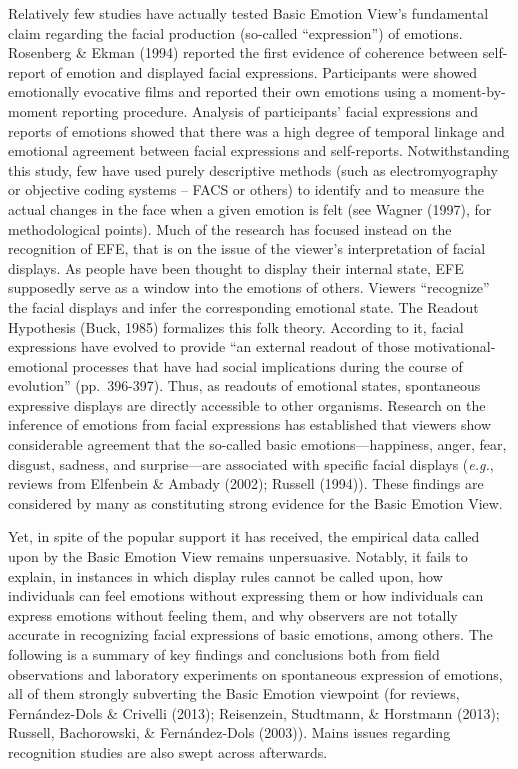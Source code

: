 \documentclass[man]{apa6}
\begin{document}
Relatively few studies have actually tested Basic Emotion View's fundamental claim regarding the facial production (so-called \enquote{expression}) of emotions. Rosenberg \& Ekman (1994) reported the first evidence of coherence between self-report of emotion and displayed facial expressions. Participants were showed emotionally evocative films and reported their own emotions using a moment-by-moment reporting procedure. Analysis of participants' facial expressions and reports of emotions showed that there was a high degree of temporal linkage and emotional agreement between facial expressions and self-reports. Notwithstanding this study, few have used purely descriptive methods (such as electromyography or objective coding systems -- FACS or others) to identify and to measure the actual changes in the face when a given emotion is felt (see Wagner (1997), for methodological points). Much of the research has focused instead on the recognition of EFE, that is on the issue of the viewer's interpretation of facial displays. As people have been thought to display their internal state, EFE supposedly serve as a window into the emotions of others. Viewers \enquote{recognize} the facial displays and infer the corresponding emotional state. The Readout Hypothesis (Buck, 1985) formalizes this folk theory. According to it, facial expressions have evolved to provide \enquote{an external readout of those motivational-emotional processes that have had social implications during the course of evolution} (pp.~396-397). Thus, as readouts of emotional states, spontaneous expressive displays are directly accessible to other organisms. Research on the inference of emotions from facial expressions has established that viewers show considerable agreement that the so-called basic emotions---happiness, anger, fear, disgust, sadness, and surprise---are associated with specific facial displays (\emph{e.g.}, reviews from Elfenbein \& Ambady (2002); Russell (1994)). These findings are considered by many as constituting strong evidence for the Basic Emotion View.

Yet, in spite of the popular support it has received, the empirical data called upon by the Basic Emotion View remains unpersuasive. Notably, it fails to explain, in instances in which display rules cannot be called upon, how individuals can feel emotions without expressing them or how individuals can express emotions without feeling them, and why observers are not totally accurate in recognizing facial expressions of basic emotions, among others. The following is a summary of key findings and conclusions both from field observations and laboratory experiments on spontaneous expression of emotions, all of them strongly subverting the Basic Emotion viewpoint (for reviews, Fernández-Dols \& Crivelli (2013); Reisenzein, Studtmann, \& Horstmann (2013); Russell, Bachorowski, \& Fernández-Dols (2003)). Mains issues regarding recognition studies are also swept across afterwards.
\end{document}
